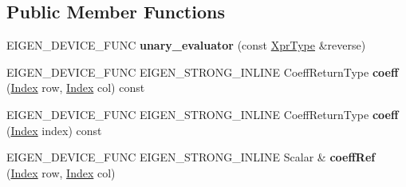 \subsection*{Public Member Functions}
\begin{DoxyCompactItemize}
\item 
\mbox{\label{struct_eigen_1_1internal_1_1unary__evaluator_3_01_reverse_3_01_arg_type_00_01_direction_01_4_01_4_a477d6b137f0554c53a6b28759c3090d3}} 
E\+I\+G\+E\+N\+\_\+\+D\+E\+V\+I\+C\+E\+\_\+\+F\+U\+NC {\bfseries unary\+\_\+evaluator} (const \hyperlink{group___core___module_class_eigen_1_1_reverse}{Xpr\+Type} \&reverse)
\item 
\mbox{\label{struct_eigen_1_1internal_1_1unary__evaluator_3_01_reverse_3_01_arg_type_00_01_direction_01_4_01_4_af3f1b6dc547152b5e4a64f10b6c0fc2a}} 
E\+I\+G\+E\+N\+\_\+\+D\+E\+V\+I\+C\+E\+\_\+\+F\+U\+NC E\+I\+G\+E\+N\+\_\+\+S\+T\+R\+O\+N\+G\+\_\+\+I\+N\+L\+I\+NE Coeff\+Return\+Type {\bfseries coeff} (\hyperlink{namespace_eigen_a62e77e0933482dafde8fe197d9a2cfde}{Index} row, \hyperlink{namespace_eigen_a62e77e0933482dafde8fe197d9a2cfde}{Index} col) const
\item 
\mbox{\label{struct_eigen_1_1internal_1_1unary__evaluator_3_01_reverse_3_01_arg_type_00_01_direction_01_4_01_4_a1680f087ebe73a14dbdad18f97d55f18}} 
E\+I\+G\+E\+N\+\_\+\+D\+E\+V\+I\+C\+E\+\_\+\+F\+U\+NC E\+I\+G\+E\+N\+\_\+\+S\+T\+R\+O\+N\+G\+\_\+\+I\+N\+L\+I\+NE Coeff\+Return\+Type {\bfseries coeff} (\hyperlink{namespace_eigen_a62e77e0933482dafde8fe197d9a2cfde}{Index} index) const
\item 
\mbox{\label{struct_eigen_1_1internal_1_1unary__evaluator_3_01_reverse_3_01_arg_type_00_01_direction_01_4_01_4_aa1883c5e2d515e520fbc917c3858e355}} 
E\+I\+G\+E\+N\+\_\+\+D\+E\+V\+I\+C\+E\+\_\+\+F\+U\+NC E\+I\+G\+E\+N\+\_\+\+S\+T\+R\+O\+N\+G\+\_\+\+I\+N\+L\+I\+NE Scalar \& {\bfseries coeff\+Ref} (\hyperlink{namespace_eigen_a62e77e0933482dafde8fe197d9a2cfde}{Index} row, \hyperlink{namespace_eigen_a62e77e0933482dafde8fe197d9a2cfde}{Index} col)

\end{DoxyCompactItemize}
